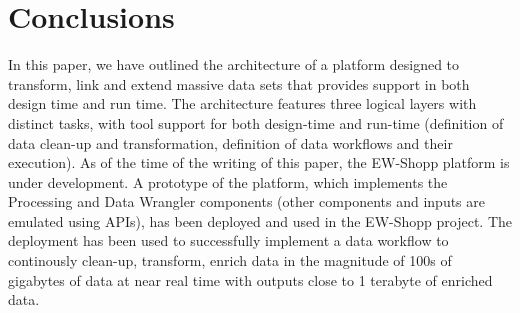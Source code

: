 \section{Conclusions}\label{sec:conclusions}
In this paper, we have outlined the architecture of a platform designed to transform, link and extend massive data sets that provides support in both design time and run time. The architecture features three logical layers with distinct tasks, with tool support for both design-time and run-time (definition of data clean-up and transformation, definition of data workflows and their execution). As of the time of the writing of this paper, the EW-Shopp platform is under development. A prototype of the platform, which implements the Processing and Data Wrangler components (other components and inputs are emulated using APIs), has been deployed and used in the EW-Shopp project. The deployment has been used to successfully implement a data workflow to continously clean-up, transform, enrich data in the magnitude of 100s of gigabytes of data at near real time with outputs close to 1 terabyte of enriched data.


